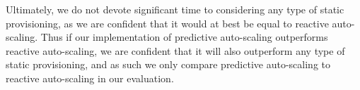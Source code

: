 Ultimately, we do not devote significant time to
considering any type of static provisioning, as we are confident that it would at
best be equal to reactive auto-scaling. Thus if our implementation of predictive
auto-scaling outperforms reactive auto-scaling, we are confident that it will
also outperform any type of static provisioning, and as such we only compare
predictive auto-scaling to reactive auto-scaling in our evaluation.
